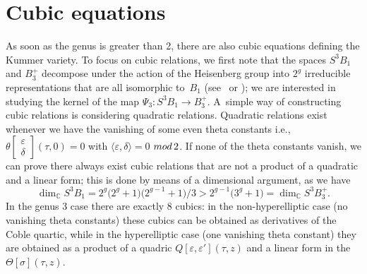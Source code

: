 \documentclass[11pt]{article}
\numberwithin{equation}{section}
\numberwithin{equation}{section}
\newcommand{\de}{\delta}
\newcommand{\ep}{\varepsilon}
\newcommand{\CC}{{\mathbb{C}}}
\def\s{\sigma}
\def\T{\Theta}
\begin{document}
\section{Cubic equations}

As soon as the genus is greater than 2, there are also cubic equations defining the Kummer va\-riety. To focus on cubic relations, we first note that the spaces $S^3 B_1$ and $B_3^+$ decompose under the action of the Heisenberg group into $2^g$ irreducible representations that are all isomorphic to~$B_1$ (see~\cite{vG} or \cite{Bea}); we are interested in studying the kernel of the map $ \Psi_3\colon S^3B_1\to B_3^+$. A~simple way of constructing cubic relations is considering quadratic relations. Quadratic relations exist whenever we have the vanishing of some even theta constants i.e., $ \theta\left[\begin{smallmatrix}\ep \\ \de\end{smallmatrix}\right] (\tau,0)=0$ with $\langle \ep , \de\rangle =0$ ${\rm mod}\, 2$. If none of the theta constants vanish, we can prove there always exist cubic relations that are not a product of a quadratic and a linear form; this is done by means of a dimensional argument, as we have
\[
 \dim_{\CC} S^3 B_1=2^g\big(2^g+1\big)\big(2^{g-1}+1\big)/3> 2^{g-1}\big( 3^g+1\big)=\dim_{\CC} S^3 B_3^+.
\]
 In the genus 3 case there are exactly 8 cubics: in the non-hyperelliptic case (no vanishing theta constants) these cubics can be obtained as derivatives of the Coble quartic, while in the hyperelliptic case (one vanishing theta constant) they are obtained as a product of a quadric $Q[\ep, \ep'](\tau, z)$ and a linear form in the $\T[\s](\tau,z)$.
\end{document}
